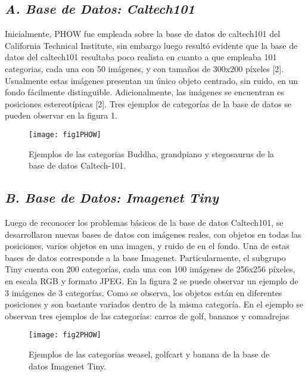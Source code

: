 \documentclass[10pt,twocolumn,letterpaper]{article}
\begin{document}
\subsection{\textit{A. Base de Datos: Caltech101}}

Inicialmente, PHOW fue empleada sobre la base de datos de caltech101 del California Technical Institute, sin embargo luego resultó evidente que la base de datos del caltech101 resultaba poco realista en cuanto a que empleaba 101 categorias, cada una con 50 imágenes, y con tamaños de 300x200 píxeles [2]. Usualmente estas imágenes presentan un único objeto centrado, sin ruido, en un fondo fácilmente distinguible. Adicionalmente, las imágenes se encuentran es posiciones estereotípicas [2]. Tres ejemplos de categorías de la base de datos se pueden observar en la figura 1.
\begin{figure}
\begin{center}
   \texttt{[image: fig1PHOW]}
\end{center}
   \caption{Ejemplos de las categorias Buddha, grandpiano y stegosaurus de la base de datos Caltech-101.}
\end{figure}

\subsection{\textit{B. Base de Datos: Imagenet Tiny}}

Luego de reconocer los problemas básicos de la base de datos Caltech101, se desarrollaron nuevas bases de datos con imágenes reales, con objetos en todas las posiciones, varios objetos en una imagen, y ruido de en el fondo. Una de estas bases de datos corresponde a la base Imagenet. Particularmente, el subgrupo Tiny cuenta con 200 categorías, cada una con 100 imágenes de 256x256 píxeles, en escala RGB y formato JPEG. En la figura 2 se puede observar un ejemplo de 3 imágenes de 3 categorías. Como se observa, los objetos están en diferentes posiciones  y son bastante variados dentro de la misma categoría. En el ejemplo se observan tres ejemplos de las categorías: carros de golf, bananos y comadrejas

\begin{figure}
\begin{center}
   \texttt{[image: fig2PHOW]}
\end{center}
   \caption{Ejemplos de las categorias weasel, golfcart y banana de la base de datos Imagenet Tiny.}
\end{figure}
\end{document}
